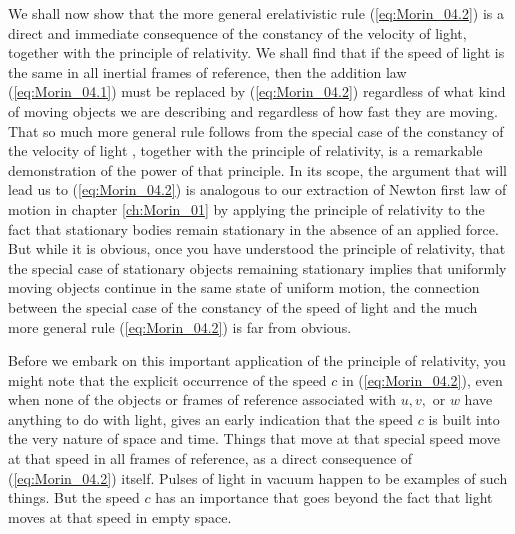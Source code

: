 We shall now show that the more general erelativistic rule (\ref{eq:Morin_04.2}) is a direct and immediate consequence of the constancy of the velocity of light, together with the principle of relativity. We shall find that if the speed of light is the same in all inertial frames of reference, then the addition law (\ref{eq:Morin_04.1}) must be replaced by (\ref{eq:Morin_04.2}) regardless of what kind of moving objects we are describing and regardless of how fast they are moving. That so much more general rule follows from the special case of the constancy of the velocity of light , together with the principle of relativity, is a remarkable demonstration of the power of that principle. In its scope, the argument that will lead us to (\ref{eq:Morin_04.2}) is analogous to our extraction of Newton first law of motion in chapter \ref{ch:Morin_01} by applying the principle of relativity to the fact that stationary bodies remain stationary in the absence of an applied force. But while it is obvious, once you have understood the principle of relativity, that the special case of stationary objects remaining stationary implies that uniformly moving objects continue in the same state of uniform motion, the connection between the special case of the constancy of the speed of light and the much more general rule (\ref{eq:Morin_04.2}) is far from obvious.

Before we embark on this important application of the principle of relativity, you might note that the explicit occurrence of the speed $c$ in (\ref{eq:Morin_04.2}), even when none of the objects or frames of reference associated with $u, v, \text{ or } w$ have anything to do with light, gives an early indication that the speed $c$ is built into the very nature of space and time. Things that move at that special speed move at that speed in all frames of reference, as a direct consequence of (\ref{eq:Morin_04.2}) itself. Pulses of light in vacuum happen to be examples of such things. But the speed $c$ has an importance that goes beyond the fact that light moves at that speed in empty space. 

